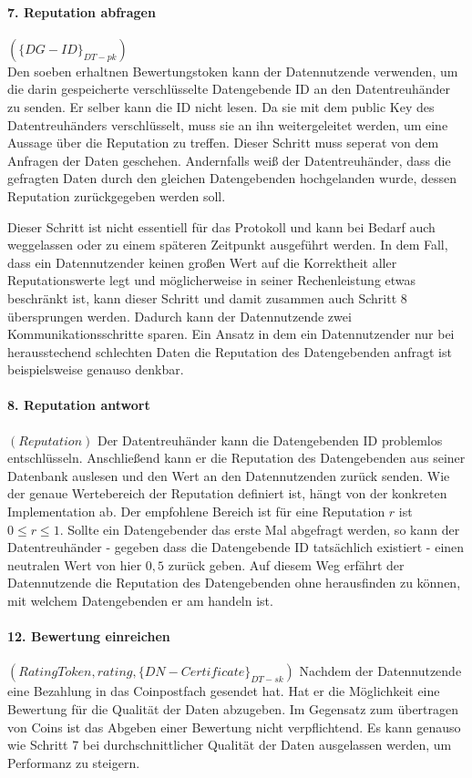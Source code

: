 \documentclass{scrreprt}
\begin{document}
\paragraph{7. Reputation abfragen}$({\{DG-ID\}}_{DT-pk})$\\
Den soeben erhaltnen Bewertungstoken kann der Datennutzende verwenden, um die darin gespeicherte verschlüsselte Datengebende ID an den Datentreuhänder zu senden. Er selber kann die ID nicht lesen. Da sie mit dem public Key des Datentreuhänders verschlüsselt, muss sie an ihn weitergeleitet werden, um eine Aussage über die Reputation zu treffen. Dieser Schritt muss seperat von dem Anfragen der Daten geschehen. Andernfalls weiß der Datentreuhänder, dass die gefragten Daten durch den gleichen Datengebenden hochgelanden wurde, dessen Reputation zurückgegeben werden soll.

Dieser Schritt ist nicht essentiell für das Protokoll und kann bei Bedarf auch weggelassen oder zu einem späteren Zeitpunkt ausgeführt werden. In dem Fall, dass ein Datennutzender keinen großen Wert auf die Korrektheit aller Reputationswerte legt und möglicherweise in seiner Rechenleistung etwas beschränkt ist, kann dieser Schritt und damit zusammen auch Schritt 8 übersprungen werden. Dadurch kann der Datennutzende zwei Kommunikationsschritte sparen. Ein Ansatz in dem ein Datennutzender nur bei herausstechend schlechten Daten die Reputation des Datengebenden anfragt ist beispielsweise genauso denkbar.

\paragraph{8. Reputation antwort}$(Reputation)$
Der Datentreuhänder kann die Datengebenden ID problemlos entschlüsseln. Anschließend kann er die Reputation des Datengebenden aus seiner Datenbank auslesen und den Wert an den Datennutzenden zurück senden. Wie der genaue Wertebereich der Reputation definiert ist, hängt von der konkreten Implementation ab. Der empfohlene Bereich ist für eine Reputation $r$ ist $0\leq r\leq 1$. Sollte ein Datengebender das erste Mal abgefragt werden, so kann der Datentreuhänder - gegeben dass die Datengebende ID tatsächlich existiert - einen neutralen Wert von hier $0,5$ zurück geben. Auf diesem Weg erfährt der Datennutzende die Reputation des Datengebenden ohne herausfinden zu können, mit welchem Datengebenden er am handeln ist.

\paragraph{12. Bewertung einreichen}$(RatingToken, rating, {\{DN-Certificate\}}_{DT-sk})$
Nachdem der Datennutzende eine Bezahlung in das Coinpostfach gesendet hat. Hat er die Möglichkeit eine Bewertung für die Qualität der Daten abzugeben. Im Gegensatz zum übertragen von Coins ist das Abgeben einer Bewertung nicht verpflichtend. Es kann genauso wie Schritt 7 bei durchschnittlicher Qualität der Daten ausgelassen werden, um Performanz zu steigern. 
\end{document}
